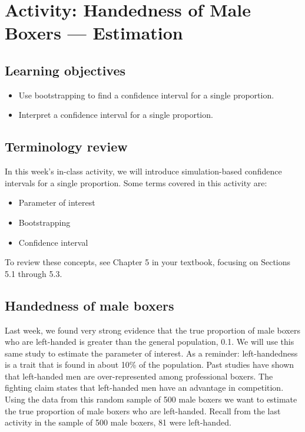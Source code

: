 \documentclass[
]{report}
\begin{document}
\newpage

\hypertarget{activity-handedness-of-male-boxers-estimation}{%
\section{Activity: Handedness of Male Boxers --- Estimation}\label{activity-handedness-of-male-boxers-estimation}}


\hypertarget{learning-objectives-3}{%
\subsection{Learning objectives}\label{learning-objectives-3}}

\begin{itemize}
\item
  Use bootstrapping to find a confidence interval for a single proportion.
\item
  Interpret a confidence interval for a single proportion.
\end{itemize}

\hypertarget{terminology-review-6}{%
\subsection{Terminology review}\label{terminology-review-6}}

In this week's in-class activity, we will introduce simulation-based confidence intervals for a single proportion. Some terms covered in this activity are:

\begin{itemize}
\item
  Parameter of interest
\item
  Bootstrapping
\item
  Confidence interval
\end{itemize}

To review these concepts, see Chapter 5 in your textbook, focusing on Sections 5.1 through 5.3.

\hypertarget{handedness-of-male-boxers-1}{%
\subsection{Handedness of male boxers}\label{handedness-of-male-boxers-1}}

Last week, we found very strong evidence that the true proportion of male boxers who are left-handed is greater than the general population, 0.1. We will use this same study to estimate the parameter of interest. As a reminder: left-handedness is a trait that is found in about 10\% of the population. Past studies have shown that left-handed men are over-represented among professional boxers. The fighting claim states that left-handed men have an advantage in competition. Using the data from this random sample of 500 male boxers we want to estimate the true proportion of male boxers who are left-handed. Recall from the last activity in the sample of 500 male boxers, 81 were left-handed.
\end{document}
